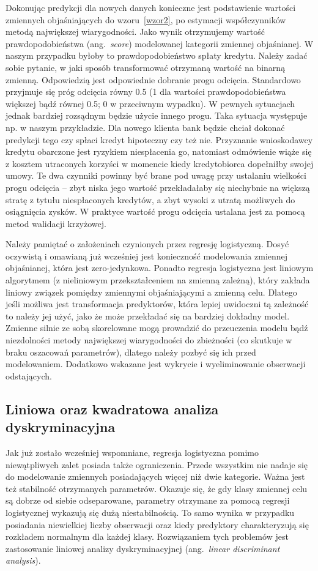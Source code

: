 \documentclass[12pt,a4paper,twoside,openany]{book}
\begin{document}
Dokonując predykcji dla nowych danych konieczne jest podstawienie wartości zmiennych objaśniających do wzoru~\ref{wzor2}, po estymacji współczynników metodą największej wiarygodności. Jako wynik otrzymujemy wartość prawdopodobieństwa (ang.~\textit{score}) modelowanej kategorii zmiennej objaśnianej. W naszym przypadku byłoby to prawdopodobieństwo spłaty kredytu. Należy zadać sobie pytanie, w jaki sposób transformować otrzymaną wartość na binarną zmienną. Odpowiedzią jest odpowiednie dobranie progu odcięcia. Standardowo przyjmuje się próg odcięcia równy 0.5 (1 dla wartości prawdopodobieństwa większej bądź równej 0.5; 0 w przeciwnym wypadku). W pewnych sytuacjach jednak bardziej rozsądnym będzie użycie innego progu. Taka sytuacja występuje np. w naszym przykładzie. Dla nowego klienta bank będzie chciał dokonać predykcji tego czy spłaci kredyt hipoteczny czy też nie. Przyznanie wnioskodawcy kredytu obarczone jest ryzykiem niespłacenia go, natomiast odmówienie wiąże się z kosztem utraconych korzyści w momencie kiedy kredytobiorca dopełniłby swojej umowy. Te dwa czynniki powinny być brane pod uwagę przy ustalaniu wielkości progu odcięcia – zbyt niska jego wartość przekładałaby się niechybnie na większą stratę z tytułu niespłaconych kredytów, a zbyt wysoki z utratą możliwych do osiągnięcia zysków. W praktyce wartość progu odcięcia ustalana jest za pomocą metod walidacji krzyżowej.

Należy pamiętać o założeniach czynionych przez regresję logistyczną. Dosyć oczywistą i omawianą już wcześniej jest konieczność modelowania zmiennej objaśnianej, która jest zero-jedynkowa. Ponadto regresja logistyczna jest liniowym algorytmem (z nieliniowym przekształceniem na zmienną zależną), który zakłada liniowy związek pomiędzy zmiennymi objaśniającymi a zmienną celu. Dlatego jeśli możliwa jest transformacja predyktorów, która lepiej uwidoczni tą zależność to należy jej użyć, jako że może przekładać się na bardziej dokładny model. Zmienne silnie ze sobą skorelowane mogą prowadzić do przeuczenia modelu bądź niezdolności metody największej wiarygodności do zbieżności (co skutkuje w braku oszacowań parametrów), dlatego należy pozbyć się ich przed modelowaniem. Dodatkowo wskazane jest wykrycie i wyeliminowanie obserwacji odstających. 

\subsection{Liniowa oraz kwadratowa analiza dyskryminacyjna}

Jak już zostało wcześniej wspomniane, regresja logistyczna pomimo niewątpliwych zalet posiada także ograniczenia. Przede wszystkim nie nadaje się do modelowanie zmiennych posiadających więcej niż dwie kategorie. Ważna jest też stabilność otrzymanych parametrów. Okazuje się, że gdy klasy zmiennej celu są dobrze od siebie odseparowane, parametry otrzymane za pomocą regresji logistycznej wykazują się dużą niestabilnością. To samo wynika w przypadku posiadania niewielkiej liczby obserwacji oraz kiedy predyktory charakteryzują się rozkładem normalnym dla każdej klasy. Rozwiązaniem tych problemów jest zastosowanie liniowej analizy dyskryminacyjnej (ang.~\textit{linear discriminant analysis}). 
\end{document}
